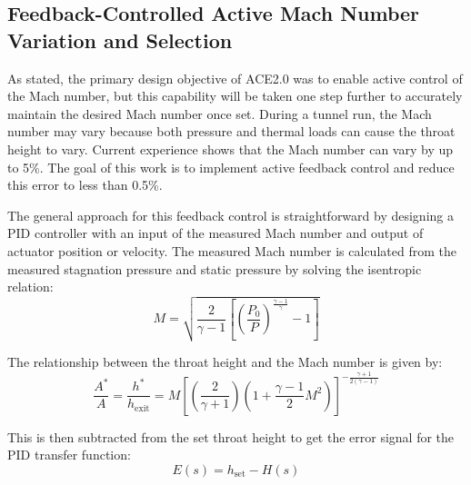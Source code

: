 \subsection{Feedback-Controlled Active Mach Number Variation and Selection}

As stated, the primary design objective of ACE2.0 was to enable active control of the Mach number, but this capability will be taken one step further to accurately maintain the desired Mach number once set. During a tunnel run, the Mach number may vary because both pressure and thermal loads can cause the throat height to vary. Current experience shows that the Mach number can vary by up to 5\%. The goal of this work is to implement active feedback control and reduce this error to less than 0.5\%.

The general approach for this feedback control is straightforward by designing a PID controller with an input of the measured Mach number and output of actuator position or velocity. The measured Mach number is calculated from the measured stagnation pressure and static pressure by solving the isentropic relation:
\begin{equation} 
    M = \sqrt{\frac{2}{\gamma - 1} \left[\left(\frac{P_0}{P}\right)^{\frac{\gamma - 1}{\gamma}} - 1\right]}
\end{equation}

\noindent The relationship between the throat height and the Mach number is given by:
\begin{equation}
    \frac{A^*}{A} = \frac{h^*}{h_{\mathrm{exit}}} = M \left[ \left( \frac{2}{\gamma+1}  \right) \left( 1 + \frac{\gamma-1}{2} M^2  \right) \right]^{-\frac{\gamma+1}{2(\gamma-1)} }
\end{equation}

\noindent This is then subtracted from the set throat height to get the error signal for the PID transfer function:
\begin{equation}
    E(s) = h_{\mathrm{set}} - H(s)
\end{equation}

